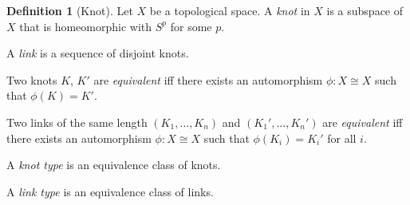 \documentclass{book}
\theoremstyle{definition}
\newtheorem{df}[lm]{Definition}
\begin{document}
\begin{df}[Knot]
Let $X$ be a topological space.
  A \emph{knot} in $X$ is a subspace of $X$ that is homeomorphic with $S^p$ for
some $p$.

A \emph{link} is a sequence of disjoint knots.

Two knots $K$, $K'$ are \emph{equivalent} iff there exists an automorphism
$\phi : X \cong X$ such that $\phi(K) = K'$.

Two links of the same length $(K_1, \ldots, K_n)$ and $(K_1', \ldots, K_n')$
are \emph{equivalent} iff there exists an automorphism $\phi : X \cong X$ such
that $\phi(K_i) = K_i'$ for all $i$.

A \emph{knot type} is an equivalence class of knots.

A \emph{link type} is an equivalence class of links.
\end{df}
\end{document}
